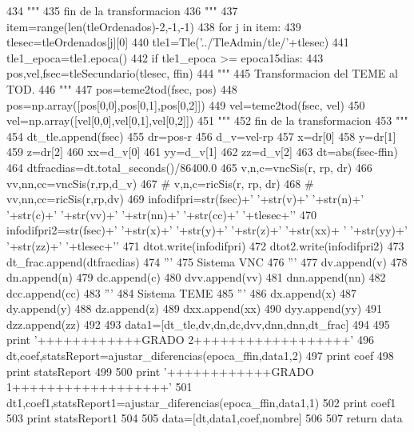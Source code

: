 \begin{DoxyCode}
434     """
435     fin de la transformacion
436     """
437     item=range(len(tleOrdenados)-2,-1,-1)       
438     for j in item:
439         tlesec=tleOrdenados[j][0]
440         tle1=Tle('../TleAdmin/tle/'+tlesec)
441         tle1_epoca=tle1.epoca()
442         if tle1_epoca >= epoca15dias:
443             pos,vel,fsec=tleSecundario(tlesec, ffin)
444             """
445             Transformacion del TEME al TOD.
446             """ 
447             pos=teme2tod(fsec, pos)
448             pos=np.array([pos[0,0],pos[0,1],pos[0,2]])
449             vel=teme2tod(fsec, vel)
450             vel=np.array([vel[0,0],vel[0,1],vel[0,2]])
451             """
452             fin de la transformacion
453             """
454             dt_tle.append(fsec)
455             dr=pos-r
456             d_v=vel-rp
457             x=dr[0]
458             y=dr[1]
459             z=dr[2]
460             xx=d_v[0]
461             yy=d_v[1]
462             zz=d_v[2]
463             dt=abs(fsec-ffin)
464             dtfracdias=dt.total_seconds()/86400.0
465             v,n,c=vncSis(r, rp, dr)
466             vv,nn,cc=vncSis(r,rp,d_v)
467     #             v,n,c=ricSis(r, rp, dr)
468     #             vv,nn,cc=ricSis(r,rp,dv)
469             infodifpri=str(fsec)+' '+str(v)+' '+str(n)+' '+str(c)+' '+str(vv)+'
       '+str(nn)+' '+str(cc)+' '+tlesec+'\n'
470             infodifpri2=str(fsec)+' '+str(x)+' '+str(y)+' '+str(z)+' '+str(xx)+
      ' '+str(yy)+' '+str(zz)+' '+tlesec+'\n'
471             dtot.write(infodifpri)
472             dtot2.write(infodifpri2)
473             dt_frac.append(dtfracdias)
474             '''
475             Sistema VNC
476             '''
477             dv.append(v)
478             dn.append(n)
479             dc.append(c)
480             dvv.append(vv)
481             dnn.append(nn)
482             dcc.append(cc)
483             '''
484             Sistema TEME
485             '''
486             dx.append(x)
487             dy.append(y)
488             dz.append(z)
489             dxx.append(xx)
490             dyy.append(yy)
491             dzz.append(zz)       
492             
493     data1=[dt_tle,dv,dn,dc,dvv,dnn,dnn,dt_frac]
494     
495     print '++++++++++++GRADO 2++++++++++++++++++'
496     dt,coef,statsReport=ajustar_diferencias(epoca_ffin,data1,2)
497     print coef
498     print statsReport
499     
500     print '++++++++++++GRADO 1++++++++++++++++++'
501     dt1,coef1,statsReport1=ajustar_diferencias(epoca_ffin,data1,1)
502     print coef1
503     print statsReport1
504 
505     data=[dt,data1,coef,nombre]   
506 
507     return data     

\end{DoxyCode}
